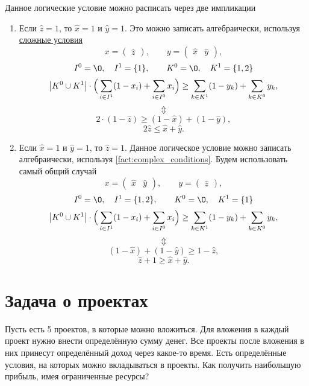 Данное логические условие можно расписать через две импликации
\begin{enumerate}[nosep]
	\item Если $\hat{z} = 1$, то $\hat{x} = 1$ и $\hat{y} = 1$. Это можно записать алгебраически, используя \hyperref[fact:complex_conditions]{сложные условия}
	\[
	x = \begin{pmatrix}\hat{z}\end{pmatrix}, \qquad y = \begin{pmatrix} \hat{x} & \hat{y} \end{pmatrix},
	\]
	\[
	I^0 = \O, \quad I^1 = \{1\}, \qquad K^0 = \O, \quad K^1 = \{1, 2\}
	\]
	\[
	\abs{K^0 \cup K^1} \cdot \Big(\sum_{i \in I^1}(1-x_i) + \sum_{i \in I^0}x_i\Big) \ge \sum_{k \in K^1}(1-y_k) + \sum_{k \in K^0}y_k,
	\]	
	\[\Updownarrow\]	
	\[
	2 \cdot (1 - \hat{z}) \ge (1 - \hat{x}) + (1 - \hat{y}),
	\]
	\[
	2\hat{z} \le \hat{x} + \hat{y}.
	\]
	
	\item Если $\hat{x} = 1$ и $\hat{y} = 1$, то $\hat{z} = 1$. Данное логическое условие можно записать алгебраически, используя \cref{fact:complex_conditions}. Будем использовать самый общий случай
	\[
	x = \begin{pmatrix}\hat{x} & \hat{y}\end{pmatrix}, \qquad y = \begin{pmatrix} \hat{z} \end{pmatrix},
	\]
	\[
	I^0 = \O, \quad I^1 = \{1, 2\}, \qquad K^0 = \O, \quad K^1 = \{1\}
	\]
	\[
	\abs{K^0 \cup K^1} \cdot \Big(\sum_{i \in I^1}(1-x_i) + \sum_{i \in I^0}x_i\Big) \ge \sum_{k \in K^1}(1-y_k) + \sum_{k \in K^0}y_k,
	\]
	\[\Updownarrow\]
	\[
	(1 - \hat{x}) + (1 - \hat{y}) \ge 1 - \hat{z},
	\]
	\[
	\hat{z} + 1 \ge \hat{x} + \hat{y}.
	\]
\end{enumerate}

\section{Задача о проектах}

\problem[о проектах]

Пусть есть 5 проектов, в которые можно вложиться. Для вложения в каждый проект нужно внести определённую сумму денег. Все проекты после вложения в них принесут определённый доход через какое-то время. Есть определённые условия, на которых можно вкладываться в проекты. Как получить наибольшую прибыль, имея ограниченные ресурсы?

\mathmodel

